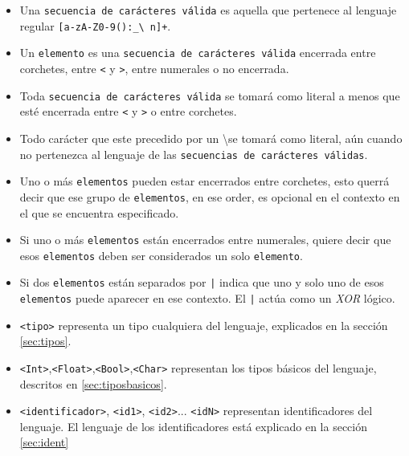 \documentclass[12pt, spanish]{report}
\begin{document}
\begin{itemize}
\item Una \texttt{secuencia de car\'acteres v\'alida} es aquella que
  pertenece al lenguaje regular \texttt{[a-zA-Z0-9():\_\textbackslash
    n]+}.
       
\item Un \texttt{elemento} es una \texttt{secuencia de car\'acteres
    v\'alida} encerrada entre corchetes, entre \texttt{<} y
  \texttt{>}, entre numerales o no encerrada.
       
\item Toda \texttt{secuencia de car\'acteres v\'alida} se tomar\'a
  como literal a menos que est\'e encerrada entre \texttt{<} y
  \texttt{>} o entre corchetes.

\item Todo car\'acter que este precedido por un \textbackslash se
  tomar\'a como literal, a\'un cuando no pertenezca al lenguaje de las
  \texttt{secuencias de car\'acteres v\'alidas}.
       
\item Uno o m\'as \texttt{elementos} pueden estar encerrados entre
  corchetes, esto querr\'a decir que ese grupo de \texttt{elementos},
  en ese order, es opcional en el contexto en el que se encuentra
  especificado.
       
\item Si uno o m\'as \texttt{elementos} est\'an encerrados entre
  numerales, quiere decir que esos \texttt{elementos} deben ser
  considerados un solo \texttt{elemento}.
       
\item Si dos \texttt{elementos} est\'an separados por \texttt{|}
  indica que uno y solo uno de esos \texttt{elementos} puede aparecer
  en ese contexto. El \texttt{|} act\'ua como un \emph{XOR} l\'ogico.
       
\item \texttt{<tipo>} representa un tipo cualquiera del lenguaje,
  explicados en la secci\'on \ref{sec:tipos}.

\item \texttt{<Int>},\texttt{<Float>},\texttt{<Bool>},\texttt{<Char>}
  representan los tipos b\'asicos del lenguaje, descritos en
  \ref{sec:tiposbasicos}.
       
\item \texttt{<identificador>}, \texttt{<id1>}, \texttt{<id2>}...
  \texttt{<idN>} representan identificadores del lenguaje. El lenguaje
  de los identificadores est\'a explicado en la secci\'on
  \ref{sec:ident}
       

\end{itemize}
\end{document}
